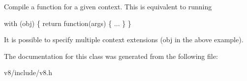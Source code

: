 Compile a function for a given context. This is equivalent to running

with (obj) \{ return function(args) \{ ... \} \}

It is possible to specify multiple context extensions (obj in the above example). 

The documentation for this class was generated from the following file\+:\begin{DoxyCompactItemize}
\item 
v8/include/v8.\+h\end{DoxyCompactItemize}
